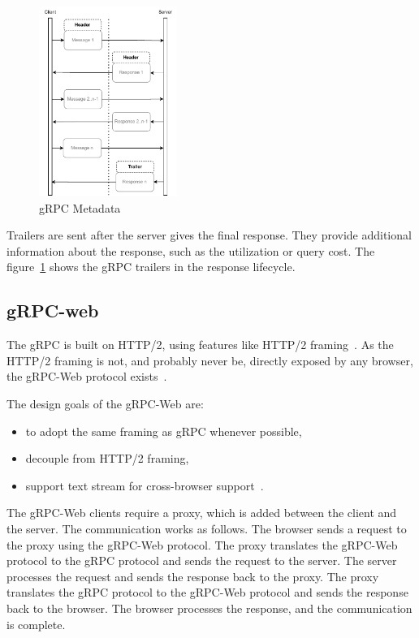 \begin{figure}[hbt!]
    \centering
    \captionsetup{justification=centering}
    \includegraphics[width=0.4\textwidth]{images/grpc-metadata}
    \caption{gRPC Metadata}
    \label{fig:grpc-metadata}
\end{figure}

Trailers are sent after the server gives the final response.
They provide additional information about the response, such as the utilization or query cost.
The figure~\ref{fig:grpc-metadata} shows the gRPC trailers in the response lifecycle.

\cite{grpc-metadata}

\subsection{gRPC-web}
The gRPC is built on HTTP/2, using features like HTTP/2 framing~\cite{grpc-protocol-http2}.
As the HTTP/2 framing is not, and probably never be, directly exposed by any browser, the gRPC-Web protocol exists~\cite{grpc-protocol-web}.

The design goals of the gRPC-Web are:
\begin{itemize}
    \item to adopt the same framing as gRPC whenever possible,
    \item decouple from HTTP/2 framing,
    \item support text stream for cross-browser support~\cite{grpc-protocol-web}.
\end{itemize}

The gRPC-Web clients require a proxy, which is added between the client and the server.
The communication works as follows.
The browser sends a request to the proxy using the gRPC-Web protocol.
The proxy translates the gRPC-Web protocol to the gRPC protocol and sends the request to the server.
The server processes the request and sends the response back to the proxy.
The proxy translates the gRPC protocol to the gRPC-Web protocol and sends the response back to the browser.
The browser processes the response, and the communication is complete.
\cite{grpc-protocol-web}

